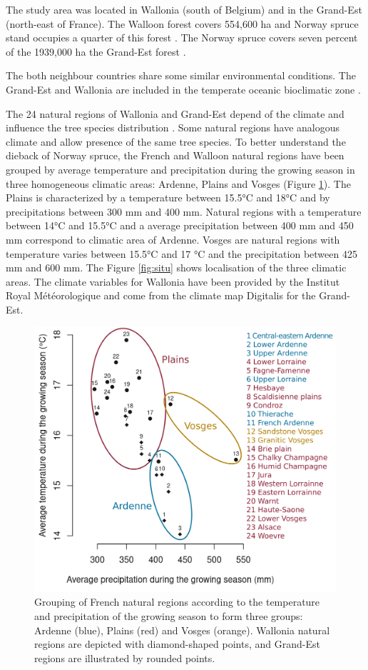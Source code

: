 \documentclass[3p,procedia]{elsarticle}
\begin{document}
The study area was located in Wallonia (south of Belgium) and in the Grand-Est (north-east of France).
The Walloon forest covers 554,600 ha and  Norway spruce stand occupies a quarter of this forest \citep{Alderweireld_2015}. 
The Norway spruce covers seven percent of the 1939,000 ha the Grand-Est forest \citep{IGN2022}. 

The both neighbour countries share some similar environmental conditions.
The Grand-Est and Wallonia are included in the temperate oceanic bioclimatic zone \citep{lindner_climate_2010}.

The 24 natural regions of Wallonia and Grand-Est depend of the climate and influence the tree species distribution \citep{walthert_tree_2017}.
Some natural regions have analogous climate and allow presence of the same tree species.
To better understand the dieback of Norway spruce, the French and Walloon natural regions have been grouped by average temperature and precipitation during the growing season in three homogeneous climatic areas: Ardenne, Plains and Vosges (Figure \ref{fig:clim}).
The Plains is characterized by a temperature between 15.5°C and 18°C and by precipitations between 300 mm and 400 mm.
Natural regions with a temperature between 14°C and 15.5°C and a average precipitation between 400 mm and 450 mm correspond to climatic area of Ardenne.
Vosges are natural regions with temperature varies between 15.5°C and 17 °C and the precipitation between 425 mm and 600 mm.
The Figure \ref{fig:situ} shows localisation of the three climatic areas. 
The climate variables for Wallonia have been provided by the Institut Royal Météorologique and come from the climate map Digitalis \citep{piedallu_presentation_2014} for the Grand-Est.
\begin{figure}[htbp] 
	\centering
	\includegraphics[width=0.8\linewidth]{climat/climat_region.png}
	\caption{Grouping of French natural regions according to the temperature and precipitation of the growing season to form three groups: Ardenne (blue), Plains (red) and Vosges (orange). Wallonia natural regions are depicted with diamond-shaped points, and Grand-Est regions are illustrated by rounded points.}
	\label{fig:clim}
\end{figure}
\end{document}
